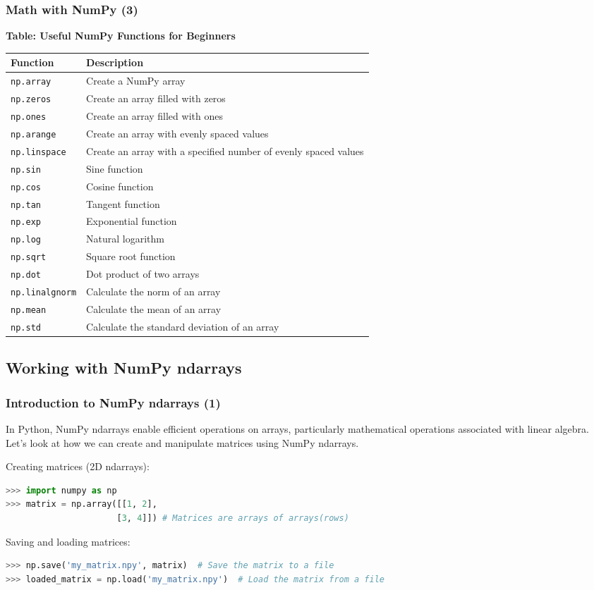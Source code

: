 \begin{frame}[fragile]
  \frametitle{Math with NumPy (3)}
  \textbf{Table: Useful NumPy Functions for Beginners}

  \begin{tabular}{l|l}
  Function & Description \\
  \hline
  \lstinline$np.array$ & Create a NumPy array \\
  \lstinline$np.zeros$ & Create an array filled with zeros \\
  \lstinline$np.ones$ & Create an array filled with ones \\
  \lstinline$np.arange$ & Create an array with evenly spaced values \\
  \lstinline$np.linspace$ & Create an array with a specified number of evenly spaced values \\
  \lstinline$np.sin$ & Sine function \\
  \lstinline$np.cos$ & Cosine function \\
  \lstinline$np.tan$ & Tangent function \\
  \lstinline$np.exp$ & Exponential function \\
  \lstinline$np.log$ & Natural logarithm \\
  \lstinline$np.sqrt$ & Square root function \\
  \lstinline$np.dot$ & Dot product of two arrays \\
  \lstinline$np.linalgnorm$ & Calculate the norm of an array \\
  \lstinline$np.mean$ & Calculate the mean of an array \\
  \lstinline$np.std$ & Calculate the standard deviation of an array \\
  \end{tabular}
\end{frame}


\subsection*{Working with NumPy ndarrays}
\begin{frame}[fragile]
  \frametitle{Introduction to NumPy ndarrays (1)}
  In Python, NumPy ndarrays enable efficient operations on arrays, particularly mathematical operations associated with linear algebra. Let's look at how we can create and manipulate matrices using NumPy ndarrays.\pause
  
  Creating matrices (2D ndarrays):
  \begin{lstlisting}[language=Python, numbers=none]
>>> import numpy as np
>>> matrix = np.array([[1, 2], 
                      [3, 4]]) # Matrices are arrays of arrays(rows)
  \end{lstlisting}\pause

  Saving and loading matrices:
  \begin{lstlisting}[language=Python, numbers=none]
>>> np.save('my_matrix.npy', matrix)  # Save the matrix to a file
>>> loaded_matrix = np.load('my_matrix.npy')  # Load the matrix from a file
  \end{lstlisting}
\end{frame}


